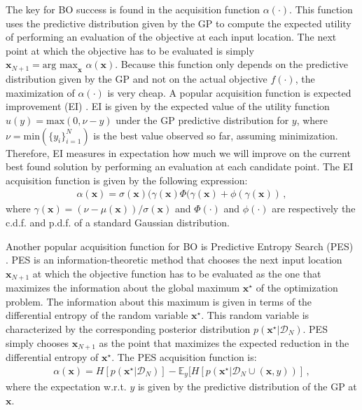 The key for BO success is found in the acquisition function $\alpha(\cdot)$. This function uses the predictive
distribution given by the GP to compute the expected utility of performing an evaluation of the objective
at each input location. The next point at which the objective has to be evaluated is simply $\mathbf{x}_{N+1} =
\text{arg max}_\mathbf{x} \,\, \alpha(\mathbf{x})$. Because this function only depends on the predictive distribution given by 
the GP and not on the actual objective $f(\cdot)$, the maximization of $\alpha(\cdot)$ is very cheap.
A popular acquisition function is expected improvement (EI) \citep{jones1998efficient}. EI is given by 
the expected value of the utility function $u(y) = \text{max}{(0, \nu - y)}$ under the GP predictive distribution for $y$,
where $\nu=\text{min}(\{y_i\}_{i=1}^{N})$ is the best value observed so far, assuming minimization.
Therefore, EI measures in expectation how much we will improve on the current best found solution by performing 
an evaluation at each candidate point. The EI acquisition function is given by the following expression:
\begin{align}
\alpha(\mathbf{x}) = \sigma(\mathbf{x})(\gamma(\mathbf{x}) \Phi(\gamma(\mathbf{x}) + \phi(\gamma(\mathbf{x}))\,,
\end{align}
where $\gamma(\mathbf{x}) = (\nu - \mu(\mathbf{x})) /\sigma(\mathbf{x})$ and $\Phi(\cdot)$ and $\phi(\cdot)$ are
respectively the c.d.f. and p.d.f. of a standard Gaussian distribution.

Another popular acquisition function for BO is Predictive Entropy Search (PES) \citep{hernandez2014predictive}. PES is 
an information-theoretic method that chooses the next input location $\mathbf{x}_{N+1}$ at which the objective 
function has to be evaluated as the one that maximizes the information about the global maximum $\mathbf{x}^\star$ of 
the optimization problem. The information about this maximum is given in terms of the differential 
entropy of the random variable $\mathbf{x}^\star$. This random variable is characterized by the corresponding 
posterior distribution $p(\mathbf{x}^\star|\mathcal{D}_N)$. PES simply chooses $\mathbf{x}_{N+1}$
as the point that maximizes the expected reduction in the differential entropy of $\mathbf{x}^\star$. 
The PES acquisition function is:
\begin{align}
\alpha(\mathbf{x}) = H[p(\mathbf{x}^\star|\mathcal{D}_N)] - \mathbb{E}_{y}[H[p(\mathbf{x}^\star|\mathcal{D}_N \cup (\mathbf{x},y))]\,,
\label{eq:pes}
\end{align}
where the expectation w.r.t. $y$ is given by the predictive distribution of the GP at $\mathbf{x}$.


